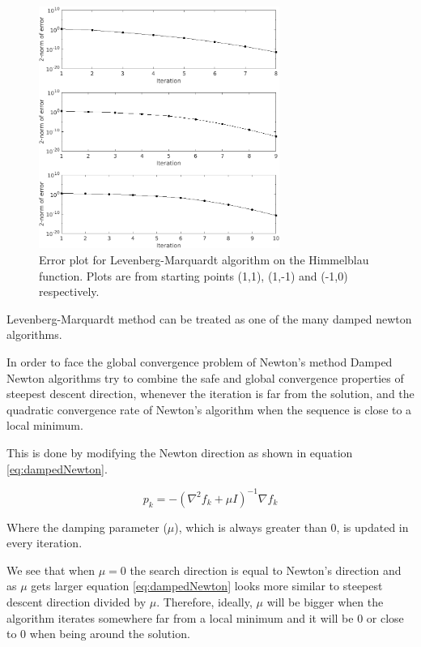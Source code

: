 \begin{figure}[htb]
\centering
\includegraphics[width=0.7\textwidth]{../img/LMError}
\caption{Error plot for Levenberg-Marquardt algorithm on the Himmelblau function. Plots are from starting points (1,1), (1,-1) and (-1,0) respectively.}
\label{fig:rateConvLM}
\end{figure}

Levenberg-Marquardt method can be treated as one of the many damped newton algorithms.

In order to face the global convergence problem of Newton's method Damped Newton algorithms try to combine the safe and global convergence properties of steepest descent direction, whenever the iteration is far from the solution, and the quadratic convergence rate of Newton's algorithm when the sequence is close to a local minimum.

This is done by modifying the Newton direction as shown in equation \ref{eq:dampedNewton}.

\begin{equation}
p_k = -(\nabla^2 f_k + \mu I)^{-1} \nabla f_k
\label{eq:dampedNewton}
\end{equation}

Where the damping parameter ($\mu$), which is always greater than 0, is updated in every iteration.

We see that when $\mu = 0$ the search direction is equal to Newton's direction and as $\mu$ gets larger equation \ref{eq:dampedNewton} looks more similar to steepest descent direction divided by $\mu$. Therefore, ideally, $\mu$ will be bigger when the algorithm iterates somewhere far from a local minimum and it will be 0 or close to 0 when being around the solution.

